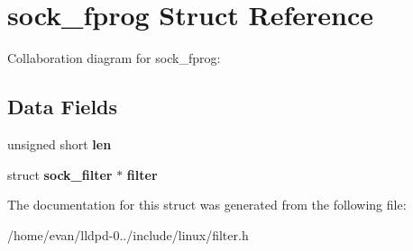 \section{sock\-\_\-fprog \-Struct \-Reference}
\label{structsock__fprog}


\-Collaboration diagram for sock\-\_\-fprog\-:
\subsection*{\-Data \-Fields}
\begin{DoxyCompactItemize}
\item 
unsigned short {\bfseries len}\label{structsock__fprog_ad4c01009aad5a218ea64c329ebfe653d}

\item 
struct {\bf sock\-\_\-filter} $\ast$ {\bfseries filter}\label{structsock__fprog_a0fa4f6a46b5e7e026608206ff75242fd}

\end{DoxyCompactItemize}


\-The documentation for this struct was generated from the following file\-:\begin{DoxyCompactItemize}
\item 
/home/evan/lldpd-\/0../include/linux/filter.\-h\end{DoxyCompactItemize}
